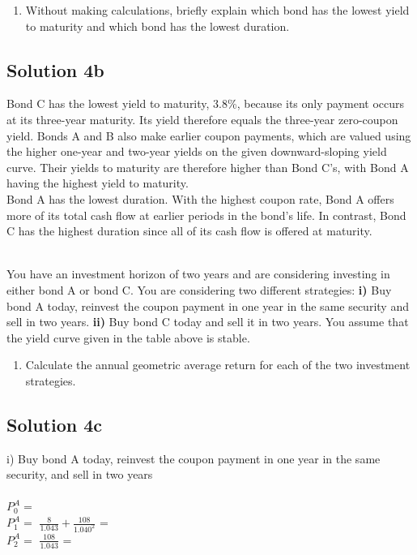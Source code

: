 \documentclass[12]{article}
\begin{document}
\color{black}
\begin{enumerate}
    \item [b)] Without making calculations, briefly explain which bond has the lowest yield to maturity and which bond has the lowest duration.
\end{enumerate}

\color{blue}
\subsection*{Solution 4b}
\noindent Bond C has the lowest yield to maturity, 3.8\%, because its only payment occurs at its three-year maturity. Its yield therefore equals the three-year zero-coupon yield. Bonds A and B also make earlier coupon payments, which are valued using the higher one-year and two-year yields on the given downward-sloping yield curve. Their yields to maturity are therefore higher than Bond C's, with Bond A having the highest yield to maturity.
\\
Bond A has the lowest duration. With the highest coupon rate, Bond A offers more of its total cash flow at earlier periods in the bond's life. In contrast, Bond C has the highest duration since all of its cash flow is offered at maturity.



\noindent
\\
\color{black}
You have an investment horizon of two years and are considering investing in either bond A or bond C. You are considering two different strategies: \textbf{i)} Buy bond A today, reinvest the coupon payment in one year in the same security and sell in two years. \textbf{ii)} Buy bond C today and sell it in two years. You assume that the yield curve given in the table above is stable.
\begin{enumerate}
    \item [c)] Calculate the annual geometric average return for each of the two investment strategies.
\end{enumerate}

\color{blue}
\subsection*{Solution 4c}
i) Buy bond A today, reinvest the coupon payment in one year in the same security, and sell in two years\\
\\
$P_0^A =$ \\
$P_1^A =$ {\Large $\frac{8}{1.043} + \frac{108}{1.040^2}$} = \\
$P_2^A =$ {\Large $\frac{108}{1.043}$} = \\
\end{document}
